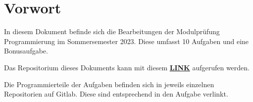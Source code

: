 \chapter*{Vorwort}
In diesem Dokument befinde sich die Bearbeitungen der Modulprüfung Programmierung im Sommersemester 2023.
Diese umfasst 10 Aufgaben und eine Bonusaufgabe.\par
Das Repositorium dieses Dokuments kann mit diesem \href{https://gitlab.thga.de/daniel.krueger/pruefung_sose_2023}{\textbf{LINK}} aufgerufen werden.\par 
Die Programmierteile der Aufgaben befinden sich in jeweils einzelnen Repositorien auf Gitlab.
Diese sind entsprechend in den Aufgabe verlinkt. \par

